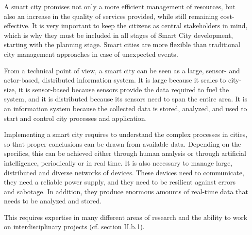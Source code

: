 A smart city promises not only a more efficient management of resources, but also an increase in the quality of services provided, while still remaining cost-effective. It is very important to keep the citizens as central stakeholders in mind, which is why they must be included in all stages of Smart City development, starting with the planning stage. Smart cities are more flexible than traditional city management approaches in case of unexpected events.

From a technical point of view, a smart city can be seen as a large, sensor- and actor-based, distributed information system. It is large because it scales to city-size, it is sensor-based because sensors provide the data required to fuel the system, and it is distributed because its sensors need to span the entire area. It is an information system because the collected data is stored, analyzed, and used to start and control city processes and application.

Implementing a smart city requires to understand the complex processes in cities, so that proper conclusions can be drawn from available data. Depending on the specifics, this can be achieved either through human analysis or through artificial intelligence, periodically or in real time. It is also necessary to manage large, distributed and diverse networks of devices. These devices need to communicate, they need a reliable power supply, and they need to be resilient against errors and sabotage. In addition, they produce enormous amounts of real-time data that needs to be analyzed and stored.

This requires expertise in many different areas of research and the ability to work on interdisciplinary projects (cf. section II.b.1).
